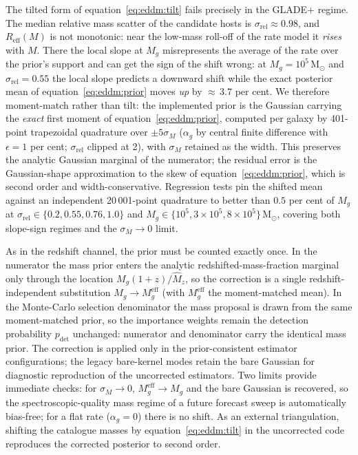 The tilted form of equation~\eqref{eq:eddm:tilt} fails precisely in the GLADE+ regime. The
median relative mass scatter of the candidate hosts is
$\sigma_{\mathrm{rel}} \approx 0.98$, %
and $R_{\mathrm{eff}}(M)$ is not monotonic: near the low-mass roll-off of the rate model it
\emph{rises} with $M$. There the local slope at $M_g$ misrepresents the average of the rate
over the prior's support and can get the sign of the shift wrong: at
$M_g = 10^{5}\,\mathrm{M}_\odot$ and $\sigma_{\mathrm{rel}} = 0.55$ the local slope predicts a
downward shift while the exact posterior mean of equation~\eqref{eq:eddm:prior} moves
\emph{up} by ${\approx}\,3.7$ per cent. %
We therefore moment-match rather than tilt: the implemented prior is the Gaussian carrying
the \emph{exact} first moment of equation~\eqref{eq:eddm:prior}, computed per galaxy by
401-point trapezoidal quadrature over $\pm 5\sigma_M$ ($\alpha_g$ by central finite
difference with $\epsilon = 1$ per cent; $\sigma_{\mathrm{rel}}$ clipped at 2), with
$\sigma_M$ retained as the width. %
This preserves the analytic Gaussian marginal of the numerator; the residual error is the
Gaussian-shape approximation to the skew of equation~\eqref{eq:eddm:prior}, which is second
order and width-conservative. Regression tests pin the shifted mean against an independent
20\,001-point quadrature to better than $0.5$ per cent of $M_g$ at
$\sigma_{\mathrm{rel}} \in \{0.2, 0.55, 0.76, 1.0\}$ and
$M_g \in \{10^{5}, 3\times10^{5}, 8\times10^{5}\}\,\mathrm{M}_\odot$, covering both
slope-sign regimes and the $\sigma_M \to 0$ limit. %

As in the redshift channel, the prior must be counted exactly once. In the numerator the
mass prior enters the analytic redshifted-mass-fraction marginal only through the location
$M_g(1+z)/\hat{M}_z$, so the correction is a single redshift-independent substitution
$M_g \to M_g^{\mathrm{eff}}$ (with $M_g^{\mathrm{eff}}$ the moment-matched mean). In the
Monte-Carlo selection denominator the mass proposal is drawn from the same moment-matched
prior, so the importance weights remain the detection probability $p_{\mathrm{det}}$
unchanged: numerator and denominator carry the identical mass prior. The correction is
applied only in the prior-consistent estimator configurations; the legacy bare-kernel modes
retain the bare Gaussian for diagnostic reproduction of the uncorrected estimators. Two
limits provide immediate checks: for $\sigma_M \to 0$,
$M_g^{\mathrm{eff}} \to M_g$ and the bare Gaussian is recovered, so the spectroscopic-quality
mass regime of a future forecast sweep is automatically bias-free; for a flat rate
($\alpha_g = 0$) there is no shift. As an external triangulation, shifting the catalogue
masses by equation~\eqref{eq:eddm:tilt} in the uncorrected code reproduces the corrected
posterior to second order. %

